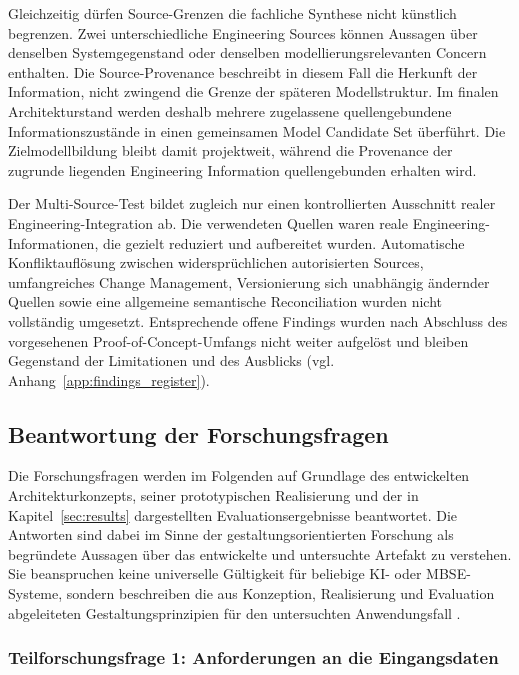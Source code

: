 Gleichzeitig dürfen Source-Grenzen die fachliche Synthese nicht künstlich
begrenzen. Zwei unterschiedliche Engineering Sources können Aussagen über
denselben Systemgegenstand oder denselben modellierungsrelevanten Concern
enthalten. Die Source-Provenance beschreibt in diesem Fall die Herkunft der
Information, nicht zwingend die Grenze der späteren Modellstruktur. Im
finalen Architekturstand werden deshalb mehrere zugelassene quellengebundene
Informationszustände in einen gemeinsamen Model Candidate Set überführt. Die
Zielmodellbildung bleibt damit projektweit, während die Provenance der
zugrunde liegenden Engineering Information quellengebunden erhalten wird.

Der Multi-Source-Test bildet zugleich nur einen kontrollierten Ausschnitt
realer Engineering-Integration ab. Die verwendeten Quellen waren reale
Engineering-Informationen, die gezielt reduziert und aufbereitet wurden.
Automatische Konfliktauflösung zwischen widersprüchlichen autorisierten
Sources, umfangreiches Change Management, Versionierung sich unabhängig
ändernder Quellen sowie eine allgemeine semantische Reconciliation wurden
nicht vollständig umgesetzt. Entsprechende offene Findings wurden nach
Abschluss des vorgesehenen Proof-of-Concept-Umfangs nicht weiter aufgelöst
und bleiben Gegenstand der Limitationen und des Ausblicks
(vgl. Anhang~\ref{app:findings_register}).

\subsection{Beantwortung der Forschungsfragen}
\label{sec:discussion_research_questions}

Die Forschungsfragen werden im Folgenden auf Grundlage des entwickelten
Architekturkonzepts, seiner prototypischen Realisierung und der in
Kapitel~\ref{sec:results} dargestellten Evaluationsergebnisse beantwortet.
Die Antworten sind dabei im Sinne der gestaltungsorientierten Forschung als
begründete Aussagen über das entwickelte und untersuchte Artefakt zu verstehen.
Sie beanspruchen keine universelle Gültigkeit für beliebige
KI- oder MBSE-Systeme, sondern beschreiben die aus Konzeption, Realisierung
und Evaluation abgeleiteten Gestaltungsprinzipien für den untersuchten
Anwendungsfall \cite{Wieringa2014,ISO42030}.


\subsubsection{Teilforschungsfrage 1: Anforderungen an die Eingangsdaten}
\label{sec:discussion_rq1}

